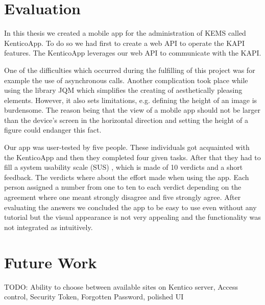 \section{Evaluation}
In this thesis we created a mobile app for the administration of KEMS called KenticoApp. To do so we had first to create a web API to operate the KAPI features. The KenticoApp leverages our web API to communicate with the KAPI. 

One of the difficulties which occurred during the fulfilling of this project was for example the use of asynchronous calls. Another complication took place while using the library JQM which simplifies the creating of aesthetically pleasing elements. However, it also sets limitations, e.g. defining the height of an image is burdensome. The reason being that the view of a mobile app should not be larger than the device's screen in the horizontal direction and setting the height of a figure could endanger this fact.

Our app was user-tested by five people. These individuals got acquainted with the KenticoApp and then they completed four given tasks. After that they had to fill a system usability scale (SUS) \cite{sus}, which is made of 10 verdicts and a short feedback. The verdicts where about the effort made when using the app. Each person assigned a number from one to ten to each verdict depending on the agreement where one meant strongly disagree and five strongly agree. After evaluating the answers we concluded the app to be easy to use even without any tutorial but the visual appearance is not very appealing and the functionality was not integrated as intuitively.

\section{Future Work}

TODO: Ability to choose between available sites on Kentico server, Access control, Security Token, Forgotten Password, polished UI
